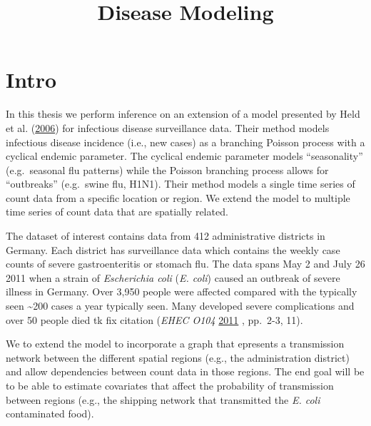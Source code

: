 \documentclass[11pt,a4paper]{article}
\title{Disease Modeling}
\author{}
\date{}
\numberwithin{equation}{section}
\begin{document}
\maketitle

\newcommand{\dw}[1]{{\color{red}{#1}}}
\newcommand{\del}[1]{{\color{blue}{}}}

\hypertarget{intro}{%
\section{Intro}\label{intro}}

In this thesis we perform inference on an extension of a model presented
by Held et al. (\protect\hyperlink{ref-held_two-component_2006}{2006})
for infectious disease surveillance data. Their method models infectious
disease incidence (i.e., new cases) as a branching Poisson process with
a cyclical endemic parameter. The cyclical endemic parameter models
``seasonality'' (e.g.~seasonal flu patterns) while the Poisson branching
process allows for ``outbreaks'' (e.g.~swine flu, H1N1). Their method
models a single time series of count data from a specific location or
region. We extend the model to multiple time series of count data that
are spatially related.

The dataset of interest contains data from 412 administrative districts
in Germany. Each district has surveillance data which contains the
weekly case counts of severe gastroenteritis or stomach flu. The data
spans May 2 and July 26 2011 when a strain of \emph{Escherichia coli}
(\emph{E. coli}) caused an outbreak of severe illness in Germany. Over
3,950 people were affected compared with the typically seen
\textasciitilde{}200 cases a year typically seen. Many developed severe
complications and over 50 people died tk fix citation (\emph{EHEC O104}
\protect\hyperlink{ref-noauthor_ehec_2011}{2011} , pp.~2-3, 11).

We to extend the model to incorporate a graph that epresents a
transmission network between the different spatial regions (e.g., the
administration district) and allow dependencies between count data in
those regions. The end goal will be to be able to estimate covariates
that affect the probability of transmission between regions (e.g., the
shipping network that transmitted the \emph{E. coli} contaminated food).
\end{document}

